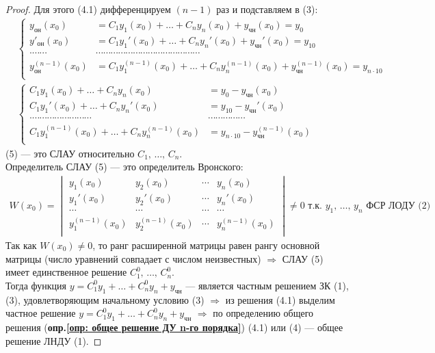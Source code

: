 \begin{proof}
    Для этого (4.1) дифференцируем $(n - 1)$ раз и подставляем в (3):
    \begin{align*}
        &\left\{ \begin{aligned}
            y_\text{он} (x_0) &= C_1y_1 (x_0) + \dots + C_ny_n (x_0) + y_{\text{чн}} (x_0) = y_0 \\
            y'_\text{он} (x_0) &= C_1y_1' (x_0) + \dots + C_ny_n' (x_0) + y_{\text{чн}}' (x_0) = y_{10} \\
            \cdot\cdots\cdots&\cdots\cdots\cdots\cdots\cdots\cdots\cdots\cdots\cdots\cdots\cdots\cdots\cdots\cdots \\
            y_\text{он}^{(n-1)} (x_0) &= C_1y_1^{(n-1)} (x_0) + \dots + C_ny_n^{(n-1)} (x_0) + y_{\text{чн}}^{(n-1)} (x_0) = y_{n\cdot 10} \\
        \end{aligned} \right. \\[1ex]
        &\left\{ \begin{aligned}
            C_1y_1 (x_0) + \dots + C_ny_n (x_0) &= y_0 - y_{\text{чн}} (x_0)\\
            C_1y_1' (x_0) + \dots + C_ny_n' (x_0) &= y_{10} - y_{\text{чн}}' (x_0)  \\
            \cdot\cdots\cdots\cdots\cdots\cdots\cdots\cdots\cdots&\cdots\cdots\cdots\cdots\cdots \\
            C_1y_1^{(n-1)} (x_0) + \dots + C_ny_n^{(n-1)} (x_0) &= y_{n\cdot 10} - y_{\text{чн}}^{(n-1)} (x_0) \\
        \end{aligned} \right. \tag{5}
    \end{align*} 
    (5) --- это СЛАУ относительно $C_1,\, \ldots,\, C_n$.\\[1ex]
    Определитель СЛАУ (5) --- это определитель Вронского:
    \begin{gather*}
        W (x_0) = \begin{vmatrix}
            y_1(x_0) & y_2(x_0) & \cdots & y_n(x_0) \\
            y_1'(x_0) & y_2'(x_0) & \cdots & y_n'(x_0) \\
            \cdots & \cdots & \cdots & \cdots \\
            y_1^{(n-1)}(x_0) & y_2^{(n-1)}(x_0) & \cdots & y_n^{(n-1)}(x_0)\\
        \end{vmatrix} \ne 0\text{ т.к. } y_1,\, \ldots,\, y_n \text{ ФСР ЛОДУ (2)}
    \end{gather*}
    Так как $W(x_0) \ne 0$, то ранг расширенной матрицы равен рангу основной матрицы (число уравнений совпадает с числом неизвестных) $\Rightarrow$ СЛАУ (5) имеет единственное решение $C_1^0,\, \ldots,\, C_n^0$. \\[1ex]
    Тогда функция $y = C_1^0 y_1 + \ldots + C_n^0y_n + y_{\text{чн}}$ --- является частным решением ЗК (1), (3), удовлетворяющим начальному условию (3) $\Rightarrow$ из решения (4.1) выделим частное решение $y = C_1^0 y_1 + \ldots + C_n^0y_n + y_{\text{чн}}$ $\Rightarrow$ по определению общего решения (\textbf{опр.\ref{опр: общее решение ДУ n-го порядка}}) (4.1) или (4) --- общее решение ЛНДУ (1).
\end{proof}

